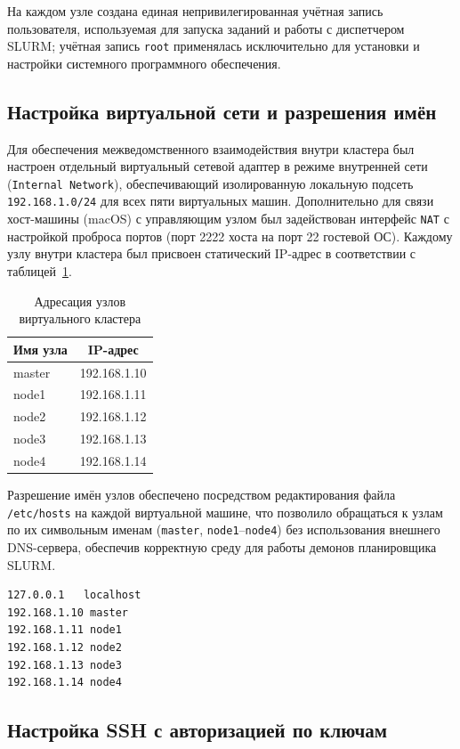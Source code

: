 На каждом узле создана единая непривилегированная учётная запись
пользователя, используемая для запуска заданий и работы с диспетчером
SLURM; учётная запись \texttt{root} применялась исключительно для
установки и настройки системного программного обеспечения.

\subsection{Настройка виртуальной сети и разрешения имён}

Для обеспечения межведомственного взаимодействия внутри кластера был настроен
отдельный виртуальный сетевой адаптер в режиме внутренней сети (\texttt{Internal Network}),
обеспечивающий изолированную локальную подсеть \texttt{192.168.1.0/24} для всех пяти 
виртуальных машин. Дополнительно для связи хост-машины (macOS) с управляющим узлом 
был задействован интерфейс \texttt{NAT} с настройкой проброса портов (порт 2222 хоста 
на порт 22 гостевой ОС). Каждому узлу внутри кластера был присвоен статический IP-адрес 
в соответствии с таблицей~\ref{tab:ip}.

\begin{table}[H]
\caption{Адресация узлов виртуального кластера}
\label{tab:ip}
\centering
\begin{tabular}{|l|c|}
\hline
Имя узла & IP-адрес \\
\hline
master & 192.168.1.10 \\
node1 & 192.168.1.11 \\
node2 & 192.168.1.12 \\
node3 & 192.168.1.13 \\
node4 & 192.168.1.14 \\
\hline
\end{tabular}
\end{table}

Разрешение имён узлов обеспечено посредством редактирования файла
\texttt{/etc/hosts} на каждой виртуальной машине, что позволило
обращаться к узлам по их символьным именам (\texttt{master},
\texttt{node1}--\texttt{node4}) без использования внешнего DNS-сервера, обеспечив 
корректную среду для работы демонов планировщика SLURM.

\begin{lstlisting}[caption={Содержимое файла /etc/hosts}]
127.0.0.1   localhost
192.168.1.10 master
192.168.1.11 node1
192.168.1.12 node2
192.168.1.13 node3
192.168.1.14 node4
\end{lstlisting}

\subsection{Настройка SSH с авторизацией по ключам}

